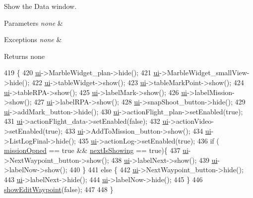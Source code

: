 Show the Data window. 


\begin{DoxyParams}{Parameters}
{\em none} & \\
\hline
\end{DoxyParams}

\begin{DoxyExceptions}{Exceptions}
{\em none} & \\
\hline
\end{DoxyExceptions}
\begin{DoxyReturn}{Returns}
none 
\end{DoxyReturn}

\begin{DoxyCode}
419 \{
420     \hyperlink{a00008_a6dc041ef6a2ffb329928d2913e8344e6}{ui}->MarbleWidget\_plan->hide();
421     \hyperlink{a00008_a6dc041ef6a2ffb329928d2913e8344e6}{ui}->MarbleWidget\_smallView->hide();
422     \hyperlink{a00008_a6dc041ef6a2ffb329928d2913e8344e6}{ui}->tableWidget->show();
423     \hyperlink{a00008_a6dc041ef6a2ffb329928d2913e8344e6}{ui}->tableMarkPoint->show();
424     \hyperlink{a00008_a6dc041ef6a2ffb329928d2913e8344e6}{ui}->tableRPA->show();
425     \hyperlink{a00008_a6dc041ef6a2ffb329928d2913e8344e6}{ui}->labelMark->show();
426     \hyperlink{a00008_a6dc041ef6a2ffb329928d2913e8344e6}{ui}->labelMission->show();
427     \hyperlink{a00008_a6dc041ef6a2ffb329928d2913e8344e6}{ui}->labelRPA->show();
428     \hyperlink{a00008_a6dc041ef6a2ffb329928d2913e8344e6}{ui}->snapShoot\_button->hide();
429     \hyperlink{a00008_a6dc041ef6a2ffb329928d2913e8344e6}{ui}->addMark\_button->hide();
430     \hyperlink{a00008_a6dc041ef6a2ffb329928d2913e8344e6}{ui}->actionFlight\_plan->setEnabled(\textcolor{keyword}{true});
431     \hyperlink{a00008_a6dc041ef6a2ffb329928d2913e8344e6}{ui}->actionFlight\_data->setEnabled(\textcolor{keyword}{false});
432     \hyperlink{a00008_a6dc041ef6a2ffb329928d2913e8344e6}{ui}->actionVideo->setEnabled(\textcolor{keyword}{true});
433     \hyperlink{a00008_a6dc041ef6a2ffb329928d2913e8344e6}{ui}->AddToMission\_button->show();
434     \hyperlink{a00008_a6dc041ef6a2ffb329928d2913e8344e6}{ui}->ListLogFinal->hide();
435     \hyperlink{a00008_a6dc041ef6a2ffb329928d2913e8344e6}{ui}->actionLog->setEnabled(\textcolor{keyword}{true});
436     \textcolor{keywordflow}{if} ( \hyperlink{a00008_aca4d1bee0b4e0f4f21192f73f4053ac7}{missionOpned} == \textcolor{keyword}{true} && \hyperlink{a00008_ab5863d8a21b807194483df01b9c48314}{nextIsShowing} == \textcolor{keyword}{true})\{
437         \hyperlink{a00008_a6dc041ef6a2ffb329928d2913e8344e6}{ui}->NextWaypoint\_button->show();
438         \hyperlink{a00008_a6dc041ef6a2ffb329928d2913e8344e6}{ui}->labelNext->show();
439         \hyperlink{a00008_a6dc041ef6a2ffb329928d2913e8344e6}{ui}->labelNow->show();
440     \}
441     \textcolor{keywordflow}{else} \{
442         \hyperlink{a00008_a6dc041ef6a2ffb329928d2913e8344e6}{ui}->NextWaypoint\_button->hide();
443         \hyperlink{a00008_a6dc041ef6a2ffb329928d2913e8344e6}{ui}->labelNext->hide();
444         \hyperlink{a00008_a6dc041ef6a2ffb329928d2913e8344e6}{ui}->labelNow->hide();
445     \}
446     \hyperlink{a00008_a35f9f0904259437c4ae21b41c4f759c1}{showEditWaypoint}(\textcolor{keyword}{false});
447 
448 \}
\end{DoxyCode}
